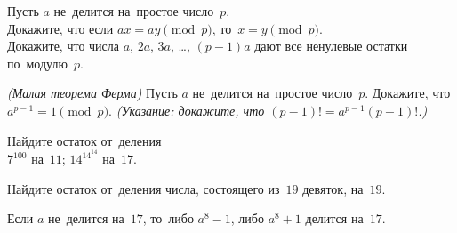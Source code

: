 \hrulefill

\begin{problems}

\item
Пусть $a$ не~делится на~простое число~$p$.
\\
\subproblem
Докажите, что если $a x = a y \pmod{p}$, то~$x = y \pmod{p}$.
\\
\subproblem
Докажите, что числа $a$, $2 a$, $3 a$, \ldots, $(p - 1) a$ дают все ненулевые
остатки по~модулю~$p$.

\item\emph{(Малая теорема Ферма)}
Пусть $a$ не~делится на~простое число~$p$.
Докажите, что $a^{p-1} = 1 \pmod{p}$.
\emph{(Указание: докажите, что $(p - 1)! = a^{p-1} (p - 1)!$.)}

\item
Найдите остаток от~деления
\\
\subproblem $7^{100}$ на~$11$;
\qquad
\subproblem $14^{14^{14}}$ на~$17$.

\item
Найдите остаток от~деления числа, состоящего из~$19$ девяток, на~$19$.

\item
Если $a$ не~делится на~$17$, то~либо $a^{8} - 1$, либо $a^{8} + 1$ делится
на~$17$.

\end{problems}

